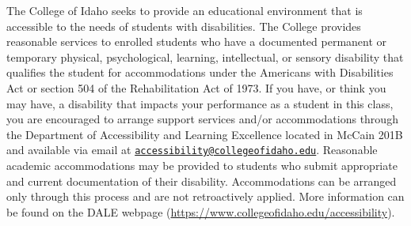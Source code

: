 \documentclass[
  letterpaper,
  DIV=11,
  numbers=noendperiod]{scrartcl}
\begin{document}
The College of Idaho seeks to provide an educational environment that is
accessible to the needs of students with disabilities. The College
provides reasonable services to enrolled students who have a documented
permanent or temporary physical, psychological, learning, intellectual,
or sensory disability that qualifies the student for accommodations
under the Americans with Disabilities Act or section 504 of the
Rehabilitation Act of 1973. If you have, or think you may have, a
disability that impacts your performance as a student in this class, you
are encouraged to arrange support services and/or accommodations through
the Department of Accessibility and Learning Excellence located in
McCain 201B and available via email at
\href{mailto:accessibility@collegeofidaho.edu}{\nolinkurl{accessibility@collegeofidaho.edu}}.
Reasonable academic accommodations may be provided to students who
submit appropriate and current documentation of their disability.
Accommodations can be arranged only through this process and are not
retroactively applied. More information can be found on the DALE webpage
(\url{https://www.collegeofidaho.edu/accessibility}).
\end{document}
